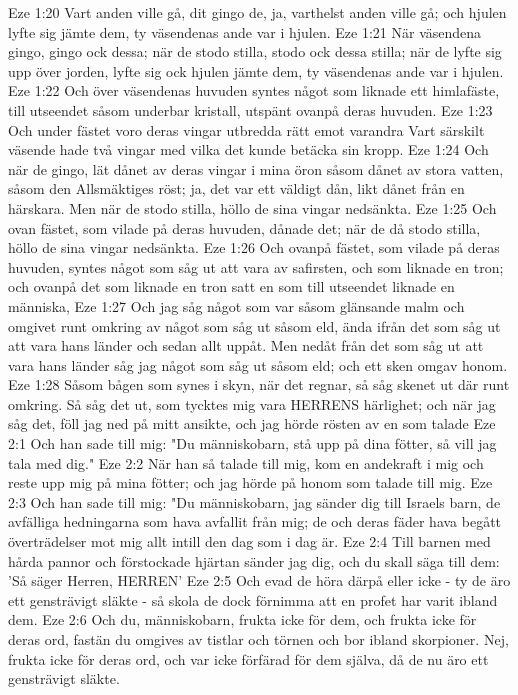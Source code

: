 Eze 1:20  Vart anden ville gå, dit gingo de, ja, varthelst anden ville gå; och hjulen lyfte sig jämte dem, ty väsendenas ande var i hjulen.
Eze 1:21  När väsendena gingo, gingo ock dessa; när de stodo stilla, stodo ock dessa stilla; när de lyfte sig upp över jorden, lyfte sig ock hjulen jämte dem, ty väsendenas ande var i hjulen.
Eze 1:22  Och över väsendenas huvuden syntes något som liknade ett himlafäste, till utseendet såsom underbar kristall, utspänt ovanpå deras huvuden.
Eze 1:23  Och under fästet voro deras vingar utbredda rätt emot varandra Vart särskilt väsende hade två vingar med vilka det kunde betäcka sin kropp.
Eze 1:24  Och när de gingo, lät dånet av deras vingar i mina öron såsom dånet av stora vatten, såsom den Allsmäktiges röst; ja, det var ett väldigt dån, likt dånet från en härskara. Men när de stodo stilla, höllo de sina vingar nedsänkta.
Eze 1:25  Och ovan fästet, som vilade på deras huvuden, dånade det; när de då stodo stilla, höllo de sina vingar nedsänkta.
Eze 1:26  Och ovanpå fästet, som vilade på deras huvuden, syntes något som såg ut att vara av safirsten, och som liknade en tron; och ovanpå det som liknade en tron satt en som till utseendet liknade en människa,
Eze 1:27  Och jag såg något som var såsom glänsande malm och omgivet runt omkring av något som såg ut såsom eld, ända ifrån det som såg ut att vara hans länder och sedan allt uppåt. Men nedåt från det som såg ut att vara hans länder såg jag något som såg ut såsom eld; och ett sken omgav honom.
Eze 1:28  Såsom bågen som synes i skyn, när det regnar, så såg skenet ut där runt omkring. Så såg det ut, som tycktes mig vara HERRENS härlighet; och när jag såg det, föll jag ned på mitt ansikte, och jag hörde rösten av en som talade
Eze 2:1  Och han sade till mig: "Du människobarn, stå upp på dina fötter, så vill jag tala med dig."
Eze 2:2  När han så talade till mig, kom en andekraft i mig och reste upp mig på mina fötter; och jag hörde på honom som talade till mig.
Eze 2:3  Och han sade till mig: "Du människobarn, jag sänder dig till Israels barn, de avfälliga hedningarna som hava avfallit från mig; de och deras fäder hava begått överträdelser mot mig allt intill den dag som i dag är.
Eze 2:4  Till barnen med hårda pannor och förstockade hjärtan sänder jag dig, och du skall säga till dem: 'Så säger Herren, HERREN'
Eze 2:5  Och evad de höra därpå eller icke - ty de äro ett gensträvigt släkte - så skola de dock förnimma att en profet har varit ibland dem.
Eze 2:6  Och du, människobarn, frukta icke för dem, och frukta icke för deras ord, fastän du omgives av tistlar och törnen och bor ibland skorpioner. Nej, frukta icke för deras ord, och var icke förfärad för dem själva, då de nu äro ett gensträvigt släkte.
